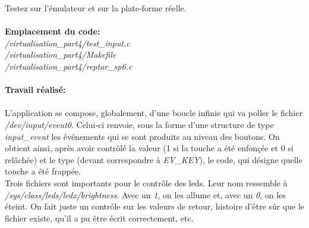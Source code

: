 Testez sur l’émulateur et sur la plate-forme réelle.\\\\
\textbf{Emplacement du code:}\\\textit{/virtualisation\_part4/test\_input.c}\\
\textit{/virtualisation\_part4/Makefile}\\
\textit{/virtualisation\_part4/reptar\_sp6.c}\\\\

\textbf{Travail réalisé: }\color{black}\\\\
L'application se compose, globalement, d'une boucle infinie qui va poller le fichier \textit{/dev/input/event0}. Celui-ci renvoie, sous la forme d'une structure de type \textit{input\_event} les événements qui se sont produits au niveau des boutons. On obtient ainsi, après avoir contrôlé la valeur (1 si la touche a été enfonçée et 0 si relâchée) et le type (devant correspondre à \textit{EV\_KEY}), le code, qui désigne quelle touche a été frappée.\\
Trois fichiers sont importants pour le contrôle des leds. Leur nom ressemble à \textit{/sys/class/leds/ledx/brightness}. Avec un \textit{1}, on les allume et, avec un \textit{0}, on les éteint. On fait juste un contrôle sur les valeurs de retour, histoire d'être sûr que le fichier existe, qu'il a pu être écrit correctement, etc. \\


